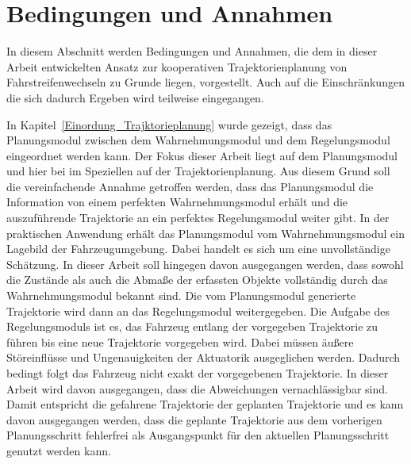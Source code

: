 

\section{Bedingungen und Annahmen}

In diesem Abschnitt werden Bedingungen und Annahmen, die dem in dieser Arbeit entwickelten Ansatz zur kooperativen Trajektorienplanung von Fahrstreifenwechseln zu Grunde liegen, vorgestellt.
Auch auf die Einschr\"ankungen die sich dadurch Ergeben wird teilweise eingegangen.

In Kapitel~\ref{Einordung_Trajktorieplanung} wurde gezeigt, dass das Planungsmodul zwischen dem Wahrnehmungsmodul und dem Regelungsmodul eingeordnet werden kann.
Der Fokus dieser Arbeit liegt auf dem Planungsmodul und hier bei im Speziellen auf der Trajektorienplanung.
Aus diesem Grund soll die vereinfachende Annahme getroffen werden, dass das Planungsmodul die Information von einem perfekten Wahrnehmungsmodul erh\"alt und die auszuf\"uhrende Trajektorie an ein perfektes Regelungsmodul weiter gibt.
In der praktischen Anwendung erh\"alt das Planungsmodul vom Wahrnehmungsmodul ein Lagebild der Fahrzeugumgebung.
Dabei handelt es sich um eine unvollst\"andige Sch\"atzung.
In dieser Arbeit soll hingegen davon ausgegangen werden, dass sowohl die Zust\"ande als auch die Abma{\ss}e der erfassten Objekte vollst\"andig durch das Wahrnehmungsmodul bekannt sind.
Die vom Planungsmodul generierte Trajektorie wird dann an das Regelungsmodul weitergegeben.
Die Aufgabe des Regelungsmoduls ist es, das Fahrzeug entlang der vorgegeben Trajektorie zu f\"uhren bis eine neue Trajektorie vorgegeben wird.
Dabei m\"ussen \"au{\ss}ere St\"oreinfl\"usse und Ungenauigkeiten der Aktuatorik ausgeglichen werden.
Dadurch bedingt folgt das Fahrzeug nicht exakt der vorgegebenen Trajektorie.
In dieser Arbeit wird davon ausgegangen, dass die Abweichungen vernachl\"assigbar sind.
Damit entspricht die gefahrene Trajektorie der geplanten Trajektorie und es kann davon ausgegangen werden, dass die geplante Trajektorie aus dem vorherigen Planungsschritt fehlerfrei als Ausgangspunkt f\"ur den aktuellen Planungsschritt genutzt werden kann.
 
